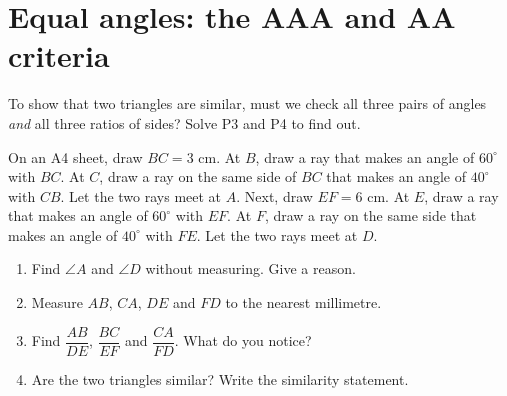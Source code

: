 \section{Equal angles: the AAA and AA criteria}

To show that two triangles are similar, must we check all three pairs of angles \emph{and} all three ratios of sides? Solve P3 and P4 to find out.

\begin{solvefirst}
  \item On an A4 sheet, draw $BC=3$ cm. At $B$, draw a ray that makes an angle of $60^\circ$ with $BC$. At $C$, draw a ray on the same side of $BC$ that makes an angle of $40^\circ$ with $CB$. Let the two rays meet at $A$.
  Next, draw $EF=6$ cm. At $E$, draw a ray that makes an angle of $60^\circ$ with $EF$. At $F$, draw a ray on the same side that makes an angle of $40^\circ$ with $FE$. Let the two rays meet at $D$.
  \begin{enumerate}[label=(\alph*),itemsep=1pt]
    \item Find $\angle A$ and $\angle D$ without measuring. Give a reason.
    \item Measure $AB$, $CA$, $DE$ and $FD$ to the nearest millimetre.
    \item Find $\dfrac{AB}{DE}$, $\dfrac{BC}{EF}$ and $\dfrac{CA}{FD}$. What do you notice?
    \item Are the two triangles similar? Write the similarity statement.
  \end{enumerate}
\begin{solution}
\end{solution}
\end{solvefirst}
